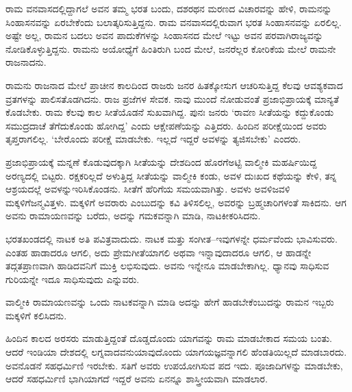 ರಾಮ ವನವಾಸದಲ್ಲಿದ್ದಾಗಲೆ ಅವನ ತಮ್ಮ ಭರತ ಬಂದು, ದಶರಥನ ಮರಣದ ವಿಚಾರವನ್ನು ಹೇಳಿ, ರಾಮನನ್ನು ಸಿಂಹಾಸನವನ್ನು ಏರಬೇಕೆಂದು ಬಲಾತ್ಕರಿಸುತ್ತಿದ್ದನು. ರಾಮ ವನವಾಸದಲ್ಲಿರುವಾಗ ಭರತ ಸಿಂಹಾಸನವನ್ನು ಏರಲಿಲ್ಲ. ಅಷ್ಟೇ ಅಲ್ಲ, ರಾಮನ ಬದಲು ಅವನ ಪಾದುಕೆಗಳನ್ನು ಸಿಂಹಾಸನದ ಮೇಲೆ ಇಟ್ಟು ಅವನ ಪರವಾಗಿ\break ರಾಜ್ಯವನ್ನು ನೋಡಿಕೊಳ್ಳುತ್ತಿದ್ದನು. ರಾಮನು ಅಯೋಧ್ಯೆಗೆ ಹಿಂತಿರುಗಿ ಬಂದ ಮೇಲೆ, ಜನರೆಲ್ಲರ ಕೋರಿಕೆಯ ಮೇಲೆ ರಾಮನೇ ರಾಜನಾದನು.

ರಾಮನು ರಾಜನಾದ ಮೇಲೆ ಪ್ರಾಚೀನ ಕಾಲದಿಂದ ರಾಜರು ಜನರ ಹಿತಕ್ಕೋಸುಗ ಆಚರಿಸುತ್ತಿದ್ದ ಕೆಲವು ಆವಶ್ಯಕವಾದ ವ್ರತಗಳನ್ನು ಪಾಲಿಸತೊಡಗಿದನು. ರಾಜ ಪ್ರಜೆಗಳ ಸೇವಕ. ನಾವು ಮುಂದೆ ನೋಡುವಂತೆ ಪ್ರಜಾಭಿಪ್ರಾಯಕ್ಕೆ ಮಾನ್ಯತೆ ಕೊಡಬೇಕು. ರಾಮ ಕೆಲವು ಕಾಲ ಸೀತೆಯೊಡನೆ ಸುಖವಾಗಿದ್ದ. ಪುನಃ ಜನರು ‘ರಾವಣ ಸೀತೆಯನ್ನು ಕದ್ದುಕೊಂಡು ಸಮುದ್ರದಾಚೆ ತೆಗೆದುಕೊಂಡು ಹೋಗಿದ್ದ’ ಎಂದು ಆಕ್ಷೇಪಣೆಯನ್ನು ಎತ್ತಿದರು. ಹಿಂದಿನ ಪರೀಕ್ಷೆಯಿಂದ ಅವರು ತೃಪ್ತರಾಗಲಿಲ್ಲ. ‘ಬೇರೊಂದು ಪರೀಕ್ಷೆ ಮಾಡಬೇಕು. ಇಲ್ಲದೆ ಇದ್ದರೆ ಅವಳನ್ನು ತ್ಯಜಿಸಬೇಕು’ ಎಂದರು.

ಪ್ರಜಾಭಿಪ್ರಾಯಕ್ಕೆ ಮನ್ನಣೆ ಕೊಡುವುದಕ್ಕಾಗಿ ಸೀತೆಯನ್ನು ದೇಶದಿಂದ ಹೊರಗೆ\break ಅಟ್ಟಿ ವಾಲ್ಮೀಕಿ ಮಹರ್ಷಿಯಿದ್ದ ಅರಣ್ಯದಲ್ಲಿ ಬಿಟ್ಟರು. ರಕ್ಷಕರಿಲ್ಲದೆ ಅಳುತ್ತಿದ್ದ ಸೀತೆಯನ್ನು ವಾಲ್ಮೀಕಿ ಕಂಡು, ಅವಳ ದುಃಖದ ಕಥೆಯನ್ನು ಕೇಳಿ, ತನ್ನ ಆಶ್ರಯದಲ್ಲೆ ಅವಳನ್ನು\break ಇರಿಸಿಕೊಂಡನು. ಸೀತೆಗೆ ಹೆರಿಗೆಯ ಸಮಯವಾಗಿತ್ತು. ಅವಳು ಅವಳಿಜವಳಿ ಮಕ್ಕಳಿಗೆ\break ಜನ್ಮವಿತ್ತಳು. ಮಕ್ಕಳಿಗೆ ಅವರಾರು ಎಂಬುದನ್ನು ಕವಿ ತಿಳಿಸಲಿಲ್ಲ, ಅವರನ್ನು ಬ್ರಹ್ಮಚಾರಿಗಳಂತೆ ಸಾಕಿದನು. ಆಗ ಅವನು ರಾಮಾಯಣವನ್ನು ಬರೆದು, ಅದನ್ನು ಗಮಕವನ್ನಾಗಿ ಮಾಡಿ, ನಾಟಕೀಕರಿಸಿದನು.

ಭರತಖಂಡದಲ್ಲಿ ನಾಟಕ ಅತಿ ಪವಿತ್ರವಾದುದು. ನಾಟಕ ಮತ್ತು ಸಂಗೀತ–ಇವುಗಳನ್ನೇ ಧರ್ಮವೆಂದು ಭಾವಿಸುವರು. ಎಂತಹ ಹಾಡಾದರೂ ಆಗಲಿ, ಅದು ಪ್ರೇಮಗೀತೆಯಾಗಲಿ ಅಥವಾ ಇನ್ನಾವುದಾದರೂ ಆಗಲಿ, ಆ ಹಾಡನ್ನೇ ತದ್ಗತಪ್ರಾಣವಾಗಿ ಹಾಡಿದವನಿಗೆ ಮುಕ್ತಿ ಲಭಿಸುವುದು. ಅವನು ಇನ್ನೇನೂ ಮಾಡಬೇಕಾಗಿಲ್ಲ. ಧ್ಯಾನವು ಸಾಧಿಸುವ ಗುರಿಯನ್ನೇ ಇದೂ ಸಾಧಿಸುವುದು ಎನ್ನುವರು.

ವಾಲ್ಮೀಕಿ ರಾಮಾಯಣವನ್ನು ಒಂದು ನಾಟಕವನ್ನಾಗಿ ಮಾಡಿ ಅದನ್ನು ಹೇಗೆ ಹಾಡ\-ಬೇಕೆಂಬುದನ್ನು ರಾಮನ ಇಬ್ಬರು ಮಕ್ಕಳಿಗೆ ಕಲಿಸಿದನು.

ಹಿಂದಿನ ಕಾಲದ ಅರಸರು ಮಾಡುತ್ತಿದ್ದಂತೆ ದೊಡ್ಡದೊಂದು ಯಾಗವನ್ನು ರಾಮ ಮಾಡಬೇಕಾದ ಸಮಯ ಬಂತು. ಆದರೆ ಇಂಡಿಯಾ ದೇಶದಲ್ಲಿ ಲಗ್ನವಾದವನು\break ಯಾವುದೊಂದು ಯಾಗಯಜ್ಞವನ್ನಾಗಲಿ ಹೆಂಡತಿಯಿಲ್ಲದೆ ಮಾಡಬಾರದು. ಅವನೊಡನೆ ಸಹಧರ್ಮಿಣಿ ಇರಬೇಕು. ಸತಿಗೆ ಅವರು ಉಪಯೋಗಿಸುವ ಪದ ಇದು. ಪೂಜಾದಿಗಳನ್ನು ಮಾಡಬೇಕು, ಆದರೆ ಸಹಧರ್ಮಿಣಿ ಭಾಗಿಯಾಗದೆ ಇದ್ದರೆ ಅವನು ಏನನ್ನೂ ಶಾಸ್ತ್ರೀಯವಾಗಿ ಮಾಡಲಾರ.

